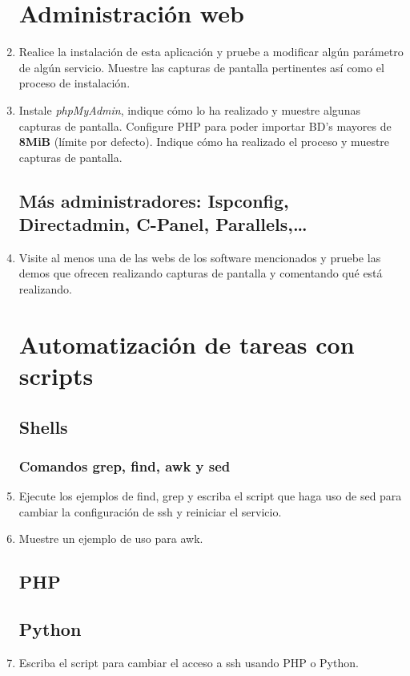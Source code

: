\documentclass[paper=a4, fontsize=11pt]{scrartcl} %
\numberwithin{equation}{section} %
\numberwithin{figure}{section} %
\numberwithin{table}{section} %
\begin{document}
\begin{enumerate}
	\section{Administración web}
	\item Realice la instalación de esta aplicación y pruebe a modificar algún parámetro de algún
	servicio. Muestre las capturas de pantalla pertinentes así como el proceso de instalación.
	
	\item Instale \textit{phpMyAdmin}, indique cómo lo ha realizado y muestre algunas capturas de
	pantalla. Configure PHP para poder importar BD's mayores de \textbf{8MiB} (límite por defecto).
	Indique cómo ha realizado el proceso y muestre capturas de pantalla.
	
	\subsection{Más administradores: Ispconfig, Directadmin, C-Panel, Parallels,\dots}
	\item Visite al menos una de las webs de los software mencionados y pruebe las demos que ofrecen
	realizando capturas de pantalla y comentando qué está realizando.
	
	\section{Automatización de tareas con scripts}
	\subsection{Shells}
	\subsubsection*{Comandos grep, find, awk y sed}
	\item Ejecute los ejemplos de find, grep y escriba el script que haga uso de sed para cambiar la
	configuración de ssh y reiniciar el servicio.
	
	\item Muestre un ejemplo de uso para awk.
	
	\subsection{PHP}
	\subsection{Python}
	\item Escriba el script para cambiar el acceso a ssh usando PHP o Python.
	

\end{enumerate}
\end{document}
